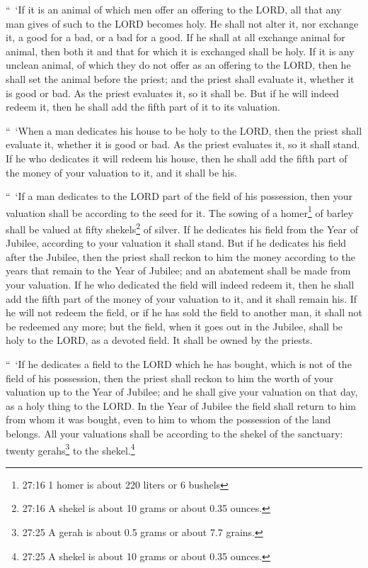 \myverse{}“ ‘If it is an animal of which men offer an offering to the LORD,
all that any man gives of such to the LORD becomes holy.
\myverse{}He shall not alter it, nor exchange it, a good for a bad, or a bad for a
good. If he shall at all exchange animal for animal, then both it and that for which it is exchanged shall
be holy.
\myverse{}If it is any unclean animal, of which they do not offer as an offering to
the LORD, then he shall set the animal before the priest;
\myverse{}and the priest shall evaluate it, whether it is good or bad. As the priest
evaluates it, so it shall be.
\myverse{}But if he will indeed redeem it, then he shall add the fifth part of it to
its valuation.


\myverse{}“ ‘When a man dedicates his house to be holy to the LORD, then
the priest shall evaluate it, whether it is good or bad. As the priest evaluates it, so it shall stand.
\myverse{}If he who dedicates it will redeem his house, then he shall add the fifth
part of the money of your valuation to it, and it shall be his.


\myverse{}“ ‘If a man dedicates to the LORD part of the field of his possession,
then your valuation shall be according to the seed for it. The sowing of a homer\footnote{27:16 1 homer is about 220 liters or 6 bushels} of barley shall be valued at fifty shekels\footnote{27:16 A shekel is about 10 grams or about 0.35 ounces.} of silver.
\myverse{}If he dedicates his field from the Year of Jubilee, according to your valuation
it shall stand.
\myverse{}But if he dedicates his field after the Jubilee, then the priest shall reckon
to him the money according to the years that remain to the Year of Jubilee; and an abatement shall be
made from your valuation.
\myverse{}If he who dedicated the field will indeed redeem it, then he shall add the
fifth part of the money of your valuation to it, and it shall remain his.
\myverse{}If he will not redeem the field, or if he has sold the field to another man,
it shall not be redeemed any more;
\myverse{}but the field, when it goes out in the Jubilee, shall be holy to the LORD,
as a devoted field. It shall be owned by the priests.


\myverse{}“ ‘If he dedicates a field to the LORD which he has bought, which
is not of the field of his possession,
\myverse{}then the priest shall reckon to him the worth of your valuation up to the
Year of Jubilee; and he shall give your valuation on that day, as a holy thing to the LORD.
\myverse{}In the Year of Jubilee the field shall return to him from whom it was bought,
even to him to whom the possession of the land belongs.
\myverse{}All your valuations shall be according to the shekel of the sanctuary: twenty
gerahs\footnote{27:25 A gerah is about 0.5 grams or about 7.7 grains.} to the shekel.\footnote{27:25 A shekel is about 10 grams or about 0.35 ounces.}


